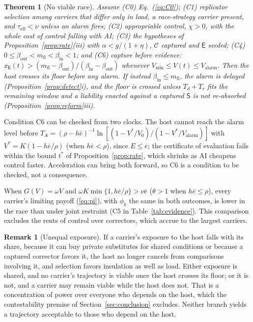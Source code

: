 \documentclass[letterpaper]{article} %
\newtheorem{theorem}{Theorem}
\theoremstyle{definition}
\newtheorem{remark}{Remark}
\newcommand{\dE}{\mathsf{E}}
\newcommand{\dS}{\mathsf{S}}
\newcommand{\cC}{\mathcal{C}}
\newcommand{\Valarm}{V_{\mathrm{alarm}}}
\newcommand{\Vmin}{V_{\min}}
\newcommand{\mfl}{m_{\mathrm{fl}}}
\newcommand{\taueff}{\tau_{\mathrm{eff}}}
\begin{document}
\begin{theorem}[No viable race]\label{thm:fail}
Assume (C0) Eq.~(\ref{eq:C0}); (C1) replicator selection among carriers that differ only in load, a race-strategy carrier present, and $\taueff<\nu$ unless an alarm fires; (C2) appropriable control, $\chi>0$, with the whole cost of control falling with AI; (C3) the hypotheses of Proposition~\ref{prop:rate}(iii) with $\alpha<g/(1+\eta)$, $\cC$ captured and $\dE$ seeded; (C4) $0\le\beta_{\mathrm{out}}<\mfl<\beta_{\mathrm{in}}<1$; and (C6) capture before evidence: $x_\dE(t)>(\mfl-\beta_{\mathrm{out}})/(\beta_{\mathrm{in}}-\beta_{\mathrm{out}})$ whenever $\Vmin\le V(t)\le\Valarm$. Then the host crosses its floor before any alarm. If instead $\beta_{\mathrm{in}}\le\mfl$, the alarm is delayed (Proposition~\ref{prop:detect}i), and the floor is crossed unless $T_d+T_r$ fits the remaining window and a liability enacted against a captured $\dS$ is not re-absorbed (Proposition~\ref{prop:reform}iii).
\end{theorem}

Condition C6 can be checked from two clocks. The host cannot reach the alarm level before $T_A=(\rho-h\bar e)^{-1}\ln[(1-V^\ast/V_0)/(1-V^\ast/\Valarm)]$ with $V^\ast=K(1-h\bar e/\rho)$ (when $h\bar e<\rho$), since $E\le\bar e$; the certificate of evaluation fails within the bound $t^\ast$ of Proposition~\ref{prop:rate}, which shrinks as AI cheapens control faster. Acceleration can bring both forward, so C6 is a condition to be checked, not a consequence.

When $G(V)=\omega V$ and $\omega K\min\{1,h\bar e/\rho\}>\nu\bar e$ ($\theta>1$ when $h\bar e\le\rho$), every carrier's limiting payoff (\ref{eq:pi}), with $\phi_k$ the same in both outcomes, is lower in the race than under joint restraint (C5 in Table~\ref{tab:evidence}). This comparison excludes the rents of control over correctors, which accrue to the largest carriers.

\begin{remark}[Unequal exposure]\label{rem:unequal}
If a carrier's exposure to the host falls with its share, because it can buy private substitutes for shared conditions or because a captured corrector favors it, the host no longer cancels from comparisons involving it, and selection favors insulation as well as load. Either exposure is shared, and no carrier's trajectory is viable once the host crosses its floor; or it is not, and a carrier may remain viable while the host does not. That is a concentration of power over everyone who depends on the host, which the contestability premise of Section~\ref{sec:conclusion} excludes. Neither branch yields a trajectory acceptable to those who depend on the host.
\end{remark}
\end{document}
